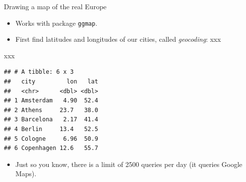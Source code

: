\documentclass[ignorenonframetext,]{beamer}
\newenvironment{Shaded}{\begin{snugshade}}{\end{snugshade}}
\newcommand{\DataTypeTok}[1]{\textcolor[rgb]{0.13,0.29,0.53}{#1}}
\newcommand{\DecValTok}[1]{\textcolor[rgb]{0.00,0.00,0.81}{#1}}
\newcommand{\KeywordTok}[1]{\textcolor[rgb]{0.13,0.29,0.53}{\textbf{#1}}}
\newcommand{\NormalTok}[1]{#1}
\newcommand{\OperatorTok}[1]{\textcolor[rgb]{0.81,0.36,0.00}{\textbf{#1}}}
\newcommand{\StringTok}[1]{\textcolor[rgb]{0.31,0.60,0.02}{#1}}
\providecommand{\tightlist}{%
  \setlength{\itemsep}{0pt}\setlength{\parskip}{0pt}}
\begin{document}
\begin{frame}[fragile]{Drawing a map of the real Europe}
\protect\hypertarget{drawing-a-map-of-the-real-europe}{}

\begin{itemize}
\item
  Works with package \texttt{ggmap}.
\item
  First find latitudes and longitudes of our cities, called
  \emph{geocoding}: xxx
\end{itemize}

\small

\begin{Shaded}
\end{Shaded}

\normalsize

xxx

\small

\begin{verbatim}
## # A tibble: 6 x 3
##   city         lon   lat
##   <chr>      <dbl> <dbl>
## 1 Amsterdam   4.90  52.4
## 2 Athens     23.7   38.0
## 3 Barcelona   2.17  41.4
## 4 Berlin     13.4   52.5
## 5 Cologne     6.96  50.9
## 6 Copenhagen 12.6   55.7
\end{verbatim}

\normalsize

\begin{itemize}
\tightlist
\item
  Just so you know, there is a limit of 2500 queries per day (it queries
  Google Maps).
\end{itemize}

\end{frame}
\end{document}
